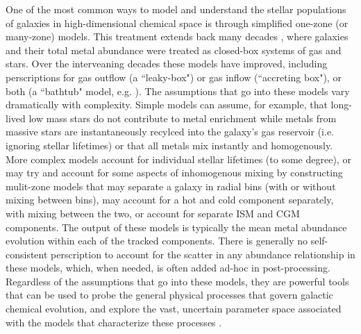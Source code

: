 One of the most common ways to model and understand the stellar populations of galaxies in high-dimensional chemical space is through simplified one-zone (or many-zone) models. This treatment extends back many decades \citep[e.g.][]{Schmidt1963,TalbotArnett1971,Lynden-Bell1975}, where galaxies and their total metal abundance were treated as closed-box systems of gas and stars. Over the interveaning decades these models have improved, including perscriptions for gas outflow (a ``leaky-box") or gas inflow (``accreting box"), or both (a ``bathtub" model, e.g. \cite{FinlatorDave2008,Bouche2010}). The assumptions that go into these models vary dramatically with complexity. Simple models can assume, for example, that long-lived low mass stars do not contribute to metal enrichment while metals from massive stars are instantaneously recylced into the galaxy's gas reservoir (i.e. ignoring stellar lifetimes) or that all metals mix instantly and homogenously. More complex models account for individual stellar lifetimes (to some degree), or may try and account for some aspects of inhomogenous mixing by constructing mulit-zone models that may separate a galaxy in radial bins (with or without mixing between bins), may account for a hot and cold component separately, with mixing between the two, or account for separate ISM and CGM components. The output of these models is typically the mean metal abundance evolution within each of the tracked components. There is generally no self-consistent perscription to account for the scatter in any abundance relationship in these models, which, when needed, is often added ad-hoc in post-processing. Regardless of the assumptions that go into these models, they are powerful tools that can be used to probe the general physical processes that govern galactic chemical evolution, and explore the vast, uncertain parameter space associated with the models that characterize these processes \citep[e.g.][]{Cote2017a}.

